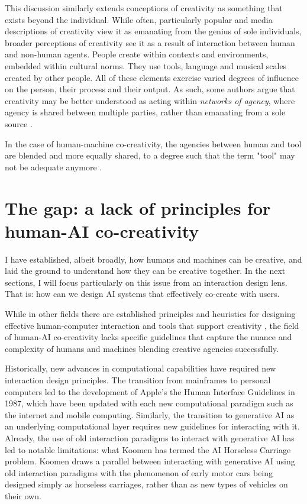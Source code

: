 This discussion similarly extends conceptions of creativity as something that exists beyond the individual. While often, particularly popular and media descriptions of creativity view it as emanating from the genius of sole individuals, broader perceptions of creativity see it as a result of interaction between human and non-human agents. People create within contexts and environments, embedded within cultural norms. They use tools, language and musical scales created by other people. All of these elements exercise varied degrees of influence on the person, their process and their output. As such, some authors argue that creativity may be better understood as acting within \textit{networks of agency}, where agency is shared between multiple parties, rather than emanating from a sole source \cite{Brown2016-tc, Malafouris2008-xn}. 

In the case of human-machine co-creativity, the agencies between human and tool are blended and more equally shared, to a degree such that the term "tool" may not be adequate anymore \cite{Lawton2023-tb}. 

\section{The gap: a lack of principles for human-AI co-creativity}

I have established, albeit broadly, how humans and machines can be creative, and laid the ground to understand how they can be creative together. In the next sections, I will focus particularly on this issue from an interaction design lens. That is: how can we design AI systems that effectively co-create with users. 

While in other fields there are established principles and heuristics for designing effective human-computer interaction and tools that support creativity \cite{Nielsen1994-df, Amershi2019-vy, Shneiderman2020-je, Wright2020-nt, Bengler2012-jf, Resnick2005-fs}, the field of human-AI co-creativity lacks specific guidelines that capture the nuance and complexity of humans and machines blending creative agencies successfully. 

Historically, new advances in computational capabilities have required new interaction design principles. The transition from mainframes to personal computers led to the development of Apple's the Human Interface Guidelines in 1987, which have been updated with each new computational paradigm such as the internet and mobile computing. Similarly, the transition to generative AI as an underlying computational layer requires new guidelines for interacting with it. Already, the use of old interaction paradigms to interact with generative AI has led to notable limitations: what Koomen \cite{Koomen2025-eu} has termed the AI Horseless Carriage problem. Koomen draws a parallel between interacting with generative AI using old interaction paradigms with the phenomenon of early motor cars being designed simply as horseless carriages, rather than as new types of vehicles on their own. 

